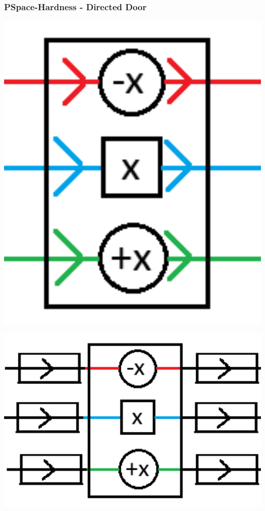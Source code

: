 \documentclass{beamer}
\begin{document}
\begin{frame}
  \frametitle{PSpace-Hardness - Directed Door}
  \begin{minipage}[t]{0.49\textwidth}
    \includegraphics[width=1\textwidth]{res/DoorDirected.png}
  \end{minipage}
  \begin{minipage}[t]{0.49\textwidth}
    \includegraphics[width=1\textwidth]{res/DirectedSim.png}
  \end{minipage}
\end{frame}
\end{document}
